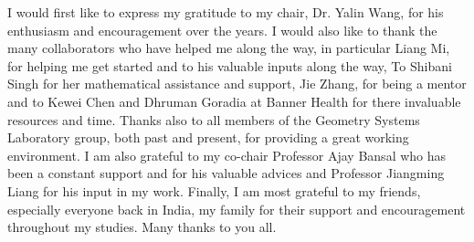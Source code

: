 \begin{acknowledgements}
	I would first like to express my gratitude to my chair, Dr. Yalin Wang, for his enthusiasm and encouragement over the years.
	I  would  also  like  to  thank  the  many  collaborators  who  have  helped  me  along  the  way,  in
	particular Liang Mi, for helping me get started and to his valuable inputs along the way, To Shibani Singh for her mathematical assistance and support, Jie Zhang, for being a mentor and to Kewei Chen and Dhruman Goradia at Banner Health for there invaluable resources and time. Thanks  also  to  all  members  of  the  Geometry Systems Laboratory group, both past and present, for providing a great working environment.
	I am also grateful to my co-chair Professor Ajay Bansal who has been a constant support and for his valuable advices and Professor Jiangming Liang for his input in my work. Finally, I am most grateful to my friends, especially everyone back in India, my family for their support and encouragement throughout my studies. Many thanks to you all.
\end{acknowledgements}
